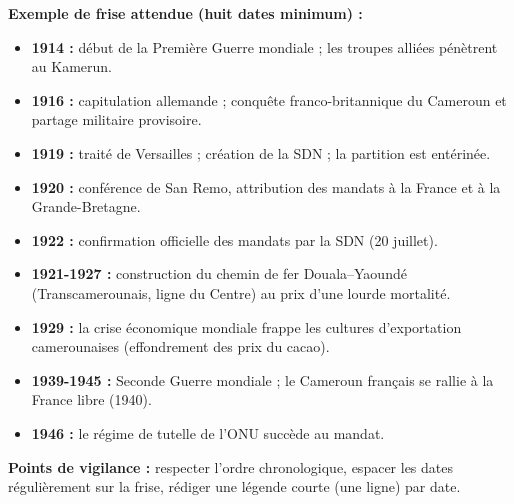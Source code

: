 \documentclass[11pt]{article}
\begin{document}
\begin{corrige}
\textbf{Exemple de frise attendue (huit dates minimum) :}
\begin{itemize}
\item \textbf{1914 :} début de la Première Guerre mondiale ; les troupes alliées pénètrent au Kamerun.
\item \textbf{1916 :} capitulation allemande ; conquête franco-britannique du Cameroun et partage militaire provisoire.
\item \textbf{1919 :} traité de Versailles ; création de la SDN ; la partition est entérinée.
\item \textbf{1920 :} conférence de San Remo, attribution des mandats à la France et à la Grande-Bretagne.
\item \textbf{1922 :} confirmation officielle des mandats par la SDN (20 juillet).
\item \textbf{1921-1927 :} construction du chemin de fer Douala--Yaoundé (Transcamerounais, ligne du Centre) au prix d'une lourde mortalité.
\item \textbf{1929 :} la crise économique mondiale frappe les cultures d'exportation camerounaises (effondrement des prix du cacao).
\item \textbf{1939-1945 :} Seconde Guerre mondiale ; le Cameroun français se rallie à la France libre (1940).
\item \textbf{1946 :} le régime de tutelle de l'ONU succède au mandat.
\end{itemize}
\textbf{Points de vigilance :} respecter l'ordre chronologique, espacer les dates régulièrement sur la frise, rédiger une légende courte (une ligne) par date.
\end{corrige}
\end{document}

